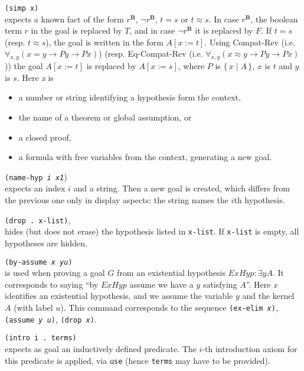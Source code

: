 \documentclass[12pt]{amsart}
\newcommand{\ex}{\exists} %
\newcommand{\typeB}{\mathbf{B}}
\newcommand{\inquotes}[1]{``#1''}
\newcommand{\set}[2]{\{\,#1\mid#2\,\}}
\newcommand{\subst}[3]{#1[#2:= #3]}
\begin{document}
\begin{appendix}
\texttt{(simp x)}\\
expects a known fact of the form $r^{\typeB}$, $\lnot r^{\typeB}$,
$t=s$ or $t \approx s$.  In case $r^{\typeB}$, the boolean term $r$ in
the goal is replaced by $T$, and in case $\lnot r^{\typeB}$ it is
replaced by $F$.  If $t=s$ (resp. $t \approx s$), the goal is written
in the form $\subst{A}{x}{t}$.  Using Compat-Rev (i.e. $\forall_{x,y}
(x=y \to P y \to P x)$) (resp. Eq-Compat-Rev (i.e. $\forall_{x,y} (x
\approx y \to P y \to P x)$)) the goal $\subst{A}{x}{t}$ is replaced
by $\subst{A}{x}{s}$, where $P$ is $\set{x}{A}$, $x$ is $t$ and $y$ is
$s$.  Here \textsl{x} is
\begin{itemize}
\item a number or string identifying a hypothesis form the context,
\item the name of a theorem or global assumption, or
\item a closed proof,
\item a formula with free variables from the context, generating a new
  goal.
\end{itemize}

\texttt{(name-hyp \textsl{i x1}})\\
expects an index $i$ and a string.  Then a new goal is created, which
differs from the previous one only in display aspects:
the string names the $i$th hypothesis.

\texttt{(drop . x-list)},\\
hides (but does not erase) the hypothesis listed in \texttt{x-list}.
If \texttt{x-list} is empty, all hypotheses are hidden.

\texttt{(by-assume \textsl{x} \textsl{y}\textsl{u})}%
\\
is used when proving a goal $G$ from an existential hypothesis $ExHyp
\colon \ex y A$.  It corresponds to saying \inquotes{by $ExHyp$ assume
  we have a $y$ satisfying $A$}.  Here \textsl{x} identifies an
existential hypothesis, and we assume the variable $y$ and the kernel
$A$ (with label $u$). This command corresponds to the sequence
\texttt{(ex-elim \textsl{x})}, \texttt{(assume \textsl{y}
  \textsl{u})}, \texttt{(drop \textsl{x})}.

\texttt{(intro i .\ terms)}\\
expects as goal an inductively defined predicate.  The $i$-th
introduction axiom for this predicate is applied, via \texttt{use}
(hence \texttt{terms} may have to be provided).


\end{appendix}
\end{document}
